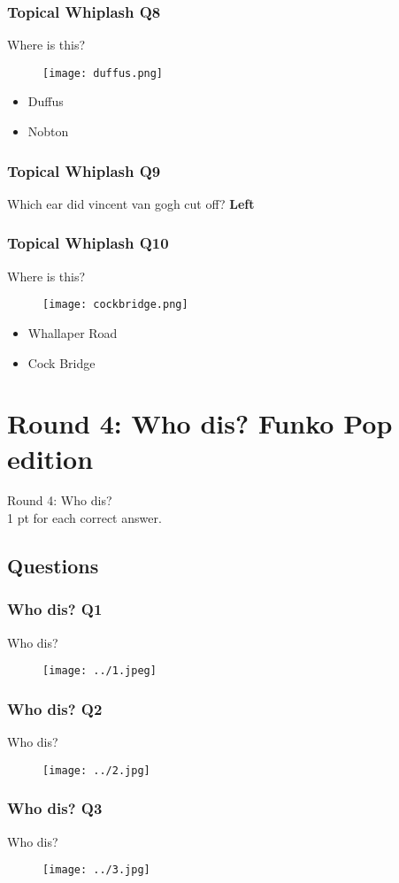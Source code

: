 \documentclass{beamer}
\begin{document}
\begin{frame}
\frametitle{Topical Whiplash Q8}
Where is this?
\begin{figure}[H]
\texttt{[image: duffus.png]}
\end{figure}
\begin{itemize}
\item Duffus  \checkmark
\item Nobton
\end{itemize}


\end{frame}


\begin{frame}
\frametitle{Topical Whiplash Q9}
Which ear did vincent van gogh cut off?
\textbf{Left}
\end{frame}

\begin{frame}
\frametitle{Topical Whiplash Q10}
Where is this?
\begin{figure}[H]
\texttt{[image: cockbridge.png]}
\end{figure}
\begin{itemize}
\item Whallaper Road
\item Cock Bridge \checkmark
\end{itemize}


\end{frame}


\section{Round 4: Who dis? Funko Pop edition}

\begin{frame}
\centering
\Huge
Round 4: Who dis?\\

\small
1 pt for each correct answer.
\end{frame}

\subsection{Questions}

\begin{frame}
\frametitle{Who dis? Q1}
Who dis?
\begin{figure}
\texttt{[image: ../1.jpeg]}
\end{figure}

\end{frame}
\begin{frame}
\frametitle{Who dis? Q2}
Who dis?
\begin{figure}
\texttt{[image: ../2.jpg]}
\end{figure}

\end{frame}
\begin{frame}
\frametitle{Who dis? Q3}
Who dis?
\begin{figure}
\texttt{[image: ../3.jpg]}
\end{figure}

\end{frame}
\end{document}
